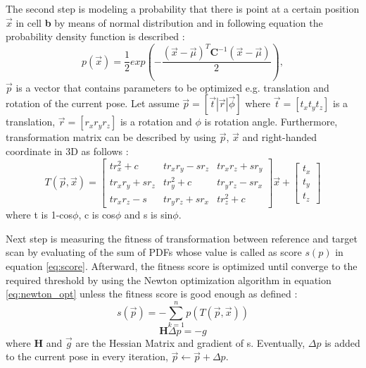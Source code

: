 \par The second step is modeling a probability that there is point at a certain position $\vec x$ in cell \textbf{b} by means of normal distribution and in following equation the probability density function is described \cite{3dndt}:
\begin{equation}
p(\vec x)=\frac{1}{2}exp(-\frac{(\vec{x}-\vec{\mu})^T\textbf{C}^{-1}(\vec{x}-\vec{\mu})}{2}),
\end{equation}
$\vec{p}$ is a vector that contains parameters to be optimized e.g. translation and rotation of the current pose. Let assume $\vec p=[\vec t | \vec r | \vec \phi ]$ where $\vec{t}=[t_x t_y t_z]$ is a translation, $\vec{r}=[r_x r_y r_z]$ is a rotation and $\phi$ is rotation angle. Furthermore, transformation matrix can be described by using $\vec{p}$, $\vec{x}$ and right-handed coordinate in 3D as follows \cite{3dndt}:
\begin{equation}
T(\vec{p},\vec{x})=
\begin{bmatrix}
tr_x^2+c		&tr_xr_y-sr_z	&tr_xr_z+sr_y\\
tr_xr_y+sr_z	&tr_y^2+c		&tr_yr_z-sr_x\\
tr_xr_z-s		&tr_yr_z+sr_x	&tr_z^2+c
\end{bmatrix}\vec{x}+ 
\begin{bmatrix}
t_x\\
t_y\\
t_z
\end{bmatrix}
\end{equation}
where t is 1-cos$\phi$, c is cos$\phi$ and s is sin$\phi$.
\\
\par Next step is measuring the fitness of transformation between reference and target scan by evaluating of the sum of PDFs whose value is called as score $s(p)$ in equation \ref{eq:score}. Afterward, the fitness score is optimized until converge to the required threshold by using the Newton optimization algorithm in equation \ref{eq:newton_opt} unless the fitness score is good enough as defined \cite{3dndt}:
\begin{equation}\label{eq:score}
    s(\vec p)=-\sum_{k=1}^np(T(\vec{p},\vec{x}))
\end{equation}
\begin{equation}\label{eq:newton_opt}
    \textbf{H}\Delta p =-g
\end{equation}
where \textbf{H} and $\vec{g}$ are the Hessian Matrix and gradient of s. Eventually, $\Delta p$ is added to the current pose in every iteration, $\vec p \xleftarrow[]{} \vec p+\Delta p$.

